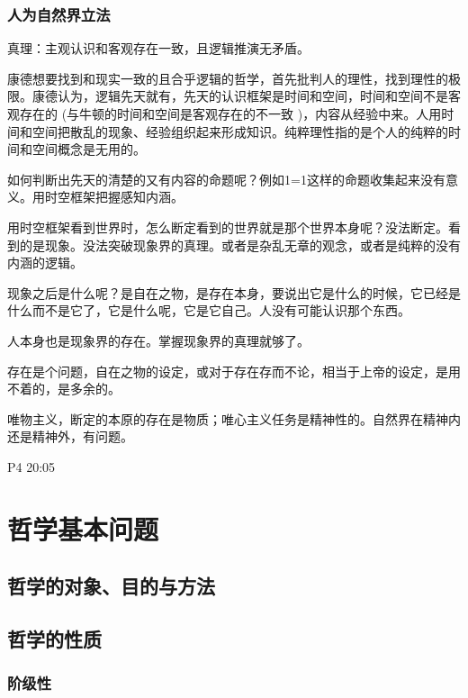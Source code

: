 \documentclass[UTF8]{../RepresentationUniverse}
\begin{document}
\subsection{人为自然界立法}



真理：主观认识和客观存在一致，且逻辑推演无矛盾。

康德想要找到和现实一致的且合乎逻辑的哲学，首先批判人的理性，找到理性的极限。康德认为，逻辑先天就有，先天的认识框架是时间和空间，时间和空间不是客观存在的 (与牛顿的时间和空间是客观存在的不一致 )，内容从经验中来。人用时间和空间把散乱的现象、经验组织起来形成知识。纯粹理性指的是个人的纯粹的时间和空间概念是无用的。

如何判断出先天的清楚的又有内容的命题呢？例如1=1这样的命题收集起来没有意义。用时空框架把握感知内涵。

用时空框架看到世界时，怎么断定看到的世界就是那个世界本身呢？没法断定。看到的是现象。没法突破现象界的真理。或者是杂乱无章的观念，或者是纯粹的没有内涵的逻辑。

现象之后是什么呢？是自在之物，是存在本身，要说出它是什么的时候，它已经是什么而不是它了，它是什么呢，它是它自己。人没有可能认识那个东西。

人本身也是现象界的存在。掌握现象界的真理就够了。

存在是个问题，自在之物的设定，或对于存在存而不论，相当于上帝的设定，是用不着的，是多余的。


唯物主义，断定的本原的存在是物质；唯心主义任务是精神性的。自然界在精神内还是精神外，有问题。

P4 20:05















\chapter{哲学基本问题}

\section{哲学的对象、目的与方法}


\section{哲学的性质}
    \subsection{阶级性}
\end{document}
